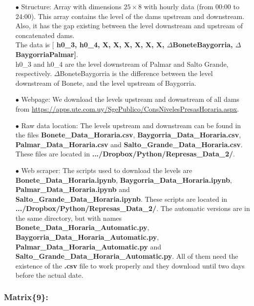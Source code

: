 \documentclass[12pt]{article}
\theoremstyle{definition}
\theoremstyle{remark}
\begin{document}
\begin{enumerate}

\item[$\bullet$] Structure: Array with dimensions $25\times8$ with hourly data (from 00:00 to 24:00). This array contains the level of the dams upstream and downstream. Also, it has the gap existing between the level downstream and upstream of concatenated dams.\\
The data is [\textbf{{\color{blue} h0\_3, h0\_4, X, X, X, X, X, X, $\Delta$BoneteBaygorria, $\Delta$BaygorriaPalmar}]}.\\
h0\_3 and h0\_4 are the level downstream of Palmar and Salto Grande, respectively. $\Delta$BoneteBaygorria is the difference between the level downstream of Bonete, and the level upstream of Baygorria.

\item[$\bullet$] Webpage: We download the levels upstream and downstream of all dams from {\color{blue} \url{https://apps.ute.com.uy/SgePublico/ConsNivelesPresasHoraria.aspx}}.

\item[$\bullet$] Raw data location: The levels upstream and downstream can be found in the files \textbf{Bonete\_Data\_Horaria.csv}, \textbf{Baygorria\_Data\_Horaria.csv}, \textbf{Palmar\_Data\_Horaria.csv} and \textbf{Salto\_Grande\_Data\_Horaria.csv}. These files are located in \textbf{.../Dropbox/Python/Represas\_Data\_2/}.

\item[$\bullet$] Web scraper: The scripts used to download the levels are \textbf{Bonete\_Data\_Horaria.ipynb}, \textbf{Baygorria\_Data\_Horaria.ipynb}, \textbf{Palmar\_Data\_Horaria.ipynb} and \textbf{Salto\_Grande\_Data\_Horaria.ipynb}. These scripts are located in \textbf{.../Dropbox/Python/Represas\_Data\_2/}. The automatic versions are in the same directory, but with names \textbf{Bonete\_Data\_Horaria\_Automatic.py}, \textbf{Baygorria\_Data\_Horaria\_Automatic.py}, \textbf{Palmar\_Data\_Horaria\_Automatic.py} and \textbf{Salto\_Grande\_Data\_Horaria\_Automatic.py}. All of them need the existence of the \textbf{.csv} file to work properly and they download until two days before the actual date.

\end{enumerate}

\subsubsection{Matrix\{9\}:}
\end{document}
